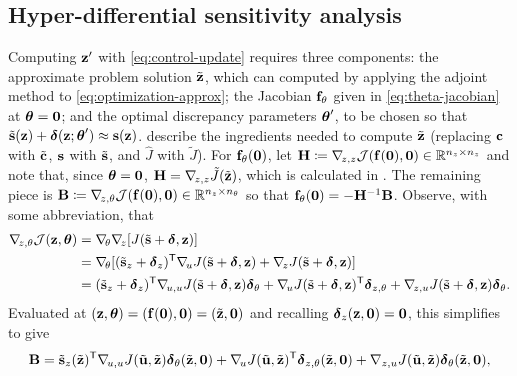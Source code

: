 \subsection{Hyper-differential sensitivity analysis}
\label{sec:hdsa-algorithm}

Computing $\mathbf{z}'$ with \cref{eq:control-update} requires three components:
the approximate problem solution $\tilde{\mathbf{z}}$, which can computed by applying the adjoint method to \cref{eq:optimization-approx};
the Jacobian $\mathbf{f}_\theta$ given in \cref{eq:theta-jacobian} at $\boldsymbol{\theta}=\mathbf{0}$;
and the optimal discrepancy parameters $\boldsymbol{\theta}'$, to be chosen so that $\tilde{\mathbf{s}}(\mathbf{z}) + \boldsymbol{\delta}(\mathbf{z};\boldsymbol{\theta}') \approx \mathbf{s}(\mathbf{z})$.
 describe the ingredients needed to compute $\tilde{\mathbf{z}}$ (replacing $\mathbf{c}$ with $\tilde{\mathbf{c}}$, $\mathbf{s}$ with $\tilde{\mathbf{s}}$, and $\hat{J}$ with $\tilde{J}$).
For $\mathbf{f}_\theta(\mathbf{0})$, let $\mathbf{H} \coloneqq \nabla_{\!z,z}\mathcal{J}(\mathbf{f}(\mathbf{0}),\mathbf{0}) \in \mathbb{R}^{n_z\times n_z}$ and note that, since $\boldsymbol{\theta}=\mathbf{0}$, $\mathbf{H} = \nabla_{\!z,z}\tilde{J}(\tilde{\mathbf{z}})$, which is calculated in .
The remaining piece is
$\mathbf{B} \coloneqq \nabla_{\!z,\theta}\mathcal{J}(\mathbf{f}(\mathbf{0}),\mathbf{0})\in\mathbb{R}^{n_z\times n_\theta}$ so that $\mathbf{f}_\theta(\mathbf{0}) = -\mathbf{H}^{-1}\mathbf{B}$.
Observe, with some abbreviation, that
\begin{align}
    \begin{aligned}
    \label{eq:B-expanded}
    \grad{z,\theta}\J(\z, \bftheta)
    &= \grad{\theta}\grad{z}[J(\tilde{\s} + \bfdelta,\z)]
    \\
    &= \grad{\theta}[
        (\tilde{\s}_z + \bfdelta_z)\trp\grad{u}J(\tilde{\s} + \bfdelta,\z)
        + \grad{z}J(\tilde{\s} + \bfdelta, \z)
    ]
    \\
    &= (\tilde{\s}_{z} + \bfdelta_{z})\trp\grad{u,u}J(\tilde{\s} + \bfdelta, \z)\bfdelta_\theta
    + \grad{u}J(\tilde{\s} + \bfdelta, \z)\trp\bfdelta_{z,\theta}
    + \grad{z,u}J(\tilde{\s} + \bfdelta, \z)\bfdelta_\theta.
    \end{aligned}
\end{align}
Evaluated at $(\mathbf{z},\boldsymbol{\theta}) = (\mathbf{f}(\mathbf{0}),\mathbf{0}) = (\tilde{\mathbf{z}},\mathbf{0})$ and recalling $\boldsymbol{\delta}_z(\mathbf{z},\mathbf{0}) = \mathbf{0}$, this simplifies to give
\begin{align}
    \label{eq:B-matrix}
    \mathbf{B}
    = \tilde{\mathbf{s}}_z(\tilde{\mathbf{z}})^{\mathsf{T}}\nabla_{\!u,u}J(\tilde{\mathbf{u}},\tilde{\mathbf{z}})\boldsymbol{\delta}_\theta(\tilde{\mathbf{z}},\mathbf{0})
    + \nabla_{\!u}J(\tilde{\mathbf{u}},\tilde{\mathbf{z}})^{\mathsf{T}}\boldsymbol{\delta}_{z,\theta}(\tilde{\mathbf{z}},\mathbf{0})
    + \nabla_{z,u}J(\tilde{\mathbf{u}}, \tilde{\mathbf{z}})\boldsymbol{\delta}_\theta(\tilde{\mathbf{z}},\mathbf{0}),
\end{align}
